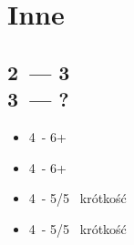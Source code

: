 \documentclass[12pt, a4paper]{article}
\begin{document}
    \pagebreak
    \section{Inne}
    \subsection{2\ntx\ --- 3\spades \\ 3\ntx\ --- ?}
    \begin{itemize}
        \item 4\clubs\ - 6+\clubs
        \item 4\diams\ - 6+\diams
        \item 4\hearts\ - 5/5 \minor\, krótkość \hearts
        \item 4\spades\ - 5/5 \minor\, krótkość \spades
    \end{itemize}
\end{document}
